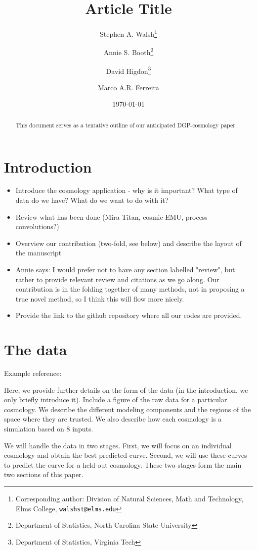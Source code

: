 \documentclass[11pt]{article}
\title{Article Title}
\author{Stephen A. Walsh\thanks{Corresponding author: Division of Natural Sciences, 
        Math and Technology, Elms College, {\tt walshst@elms.edu}} \and 
        Annie S. Booth\thanks{Department of Statistics, North Carolina State University} \and
        David Higdon\thanks{Department of Statistics, Virginia Tech} \and
        Marco A.R. Ferreira\footnotemark[3]}
\date{\today}
\begin{document}
\maketitle
\bigskip

\begin{abstract} 
This document serves as a tentative outline of our anticipated DGP-cosmology paper.
\end{abstract}


\section{Introduction}

\begin{itemize}
    \item Introduce the cosmology application - why is it important?  What type of data do we have?  What do we want to do with it?
    \item Review what has been done (Mira Titan, cosmic EMU, process convolutions?)
    \item Overview our contribution (two-fold, see below) and describe the layout of the manuscript
    \item Annie says: I would prefer not to have any section labelled "review", but rather to provide relevant review and citations as we go along.  Our contribution is in the folding together of many methods, not in proposing a true novel method, so I think this will flow more nicely.
    \item Provide the link to the github repository where all our codes are provided.
\end{itemize}

\section{The data}

Example reference: \citep{damianou2013deep}

Here, we provide further details on the form of the data (in the introduction, we only briefly introduce it).  Include a figure of the raw data for a particular cosmology.  We describe the different modeling components and the regions of the space where they are trusted.  We also describe how each cosmology is a simulation based on 8 inputs.  

We will handle the data in two stages.  First, we will focus on an individual cosmology and obtain the best predicted curve.  Second, we will use these curves to predict the curve for a held-out cosmology.  These two stages form the main two sections of this paper.
\end{document}
